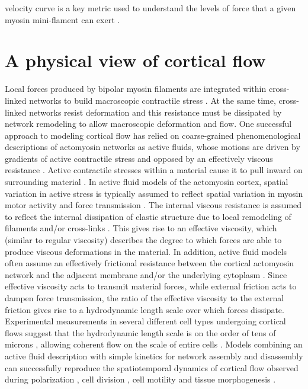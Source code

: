 velocity curve is a key metric used to understand the levels of force that a given myosin mini-flament can exert \cite{howard2001mechanics}.



\section{A physical view of cortical flow}

Local forces produced by bipolar myosin filaments are integrated within cross-linked networks to build macroscopic contractile stress \cite{Murrell:2015aa,Bendix20083126,Janson1005}.  At the same time, cross-linked networks resist deformation and this resistance must be dissipated by network remodeling to allow macroscopic deformation and flow.  One successful approach to modeling cortical flow has relied on coarse-grained phenomenological descriptions of actomyosin networks as active fluids, whose motions are driven by gradients of active contractile stress and opposed by an effectively viscous resistance \cite{cellmech_flows}.  Active contractile stresses within a material cause it to pull inward on surrounding material \cite{whitfield2016}. In active fluid models of the actomyosin cortex, spatial variation in active stress is typically assumed to reflect spatial variation in myosin motor activity and force transmission \cite{PhysRevLett.106.028103}.  The internal viscous resistance is assumed to reflect the internal dissipation of elastic structure due to local remodeling of filaments and/or cross-links \cite{Salbreux2012536, De-La-Cruz:2015aa}. This gives rise to an effective viscosity, which (similar to regular viscosity) describes the degree to which forces are able to produce viscous deformations in the material.  In addition, active fluid models often assume an effectively frictional resistance between the cortical actomyosin  network and the adjacent membrane and/or the underlying cytoplasm \cite{PhysRevLett.106.028103}.  Since effective viscosity acts to transmit material forces, while  external friction acts to dampen force transmission, the ratio of the effective viscosity to the external friction gives rise to a hydrodynamic length scale over which forces dissipate. Experimental measurements in several different cell types undergoing cortical flows \cite{saha} suggest that the hydrodynamic length scale is on the order of tens of microns \cite{cellmech_flows}, allowing coherent flow on the scale of  entire cells \cite{Behrndt257}. Models combining an active fluid description with simple kinetics for network assembly and disassembly can successfully reproduce the spatiotemporal dynamics of cortical flow observed during polarization \cite{cellmech_flows}, cell division \cite{Turlier2014114,PhysRevLett.103.058102}, cell motility \cite{Keren:2009aa,RevModPhys.85.1143} and tissue morphogenesis \cite{Behrndt257}.  

